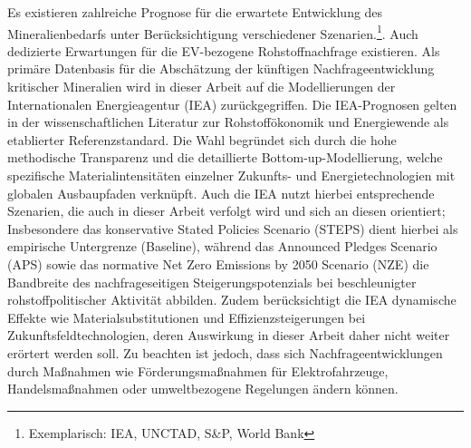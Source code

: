 \documentclass[12pt,a4paper,oneside]{book} %
\begin{document}
Es existieren zahlreiche Prognose für die erwartete Entwicklung des Mineralienbedarfs unter Berücksichtigung verschiedener Szenarien.\footnote{Exemplarisch: IEA, UNCTAD, S\&P, World Bank}. Auch dedizierte Erwartungen für die EV-bezogene Rohstoffnachfrage existieren.\autocite{The vulnerability of electric vehicle deployment to critical mineral supply}
Als primäre Datenbasis für die Abschätzung der künftigen Nachfrageentwicklung kritischer Mineralien wird in dieser Arbeit auf die Modellierungen der Internationalen Energieagentur (IEA) zurückgegriffen. Die IEA-Prognosen gelten in der wissenschaftlichen Literatur zur Rohstoffökonomik und Energiewende als etablierter Referenzstandard. Die Wahl begründet sich durch die hohe methodische Transparenz und die detaillierte Bottom-up-Modellierung, welche spezifische Materialintensitäten einzelner Zukunfts- und Energietechnologien mit globalen Ausbaupfaden verknüpft. Auch die IEA nutzt hierbei entsprechende Szenarien, die auch in dieser Arbeit verfolgt wird und sich an diesen orientiert; Insbesondere das konservative Stated Policies Scenario (STEPS) dient hierbei als empirische Untergrenze (Baseline), während das Announced Pledges Scenario (APS) sowie das normative Net Zero Emissions by 2050 Scenario (NZE) die Bandbreite des nachfrageseitigen Steigerungspotenzials bei beschleunigter rohstoffpolitischer Aktivität abbilden. Zudem berücksichtigt die IEA dynamische Effekte wie Materialsubstitutionen und Effizienzsteigerungen bei Zukunftsfeldtechnologien, deren Auswirkung in dieser Arbeit daher nicht weiter erörtert werden soll. Zu beachten ist jedoch, dass sich Nachfrageentwicklungen durch Maßnahmen wie Förderungsmaßnahmen für Elektrofahrzeuge, Handelsmaßnahmen oder umweltbezogene Regelungen ändern können.\autocite{The strategic role of critical minerals in electric vehicle production, S. 33} 
\end{document}
